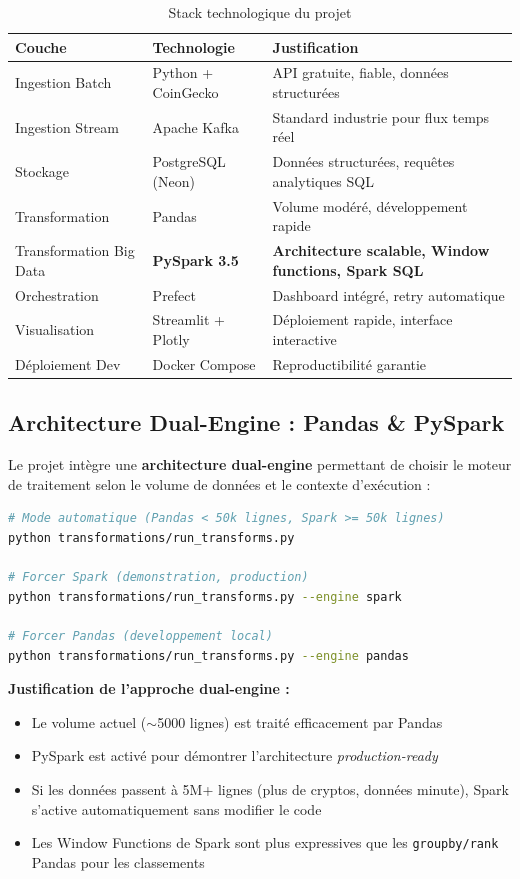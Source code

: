 \documentclass[12pt,a4paper]{article}
\begin{document}
\begin{table}[H]
\centering
\begin{tabular}{|l|l|p{5.5cm}|}
\hline
\textbf{Couche} & \textbf{Technologie} & \textbf{Justification} \\
\hline
Ingestion Batch    & Python + CoinGecko   & API gratuite, fiable, données structurées \\
\hline
Ingestion Stream   & Apache Kafka         & Standard industrie pour flux temps réel \\
\hline
Stockage           & PostgreSQL (Neon)    & Données structurées, requêtes analytiques SQL \\
\hline
Transformation     & Pandas               & Volume modéré, développement rapide \\
\hline
\rowcolor{orange!15}
Transformation Big Data & \textbf{PySpark 3.5} & \textbf{Architecture scalable, Window functions, Spark SQL} \\
\hline
Orchestration      & Prefect              & Dashboard intégré, retry automatique \\
\hline
Visualisation      & Streamlit + Plotly   & Déploiement rapide, interface interactive \\
\hline
Déploiement Dev    & Docker Compose       & Reproductibilité garantie \\
\hline
\end{tabular}
\caption{Stack technologique du projet}
\end{table}

\subsection{Architecture Dual-Engine : Pandas \& PySpark}

Le projet intègre une \textbf{architecture dual-engine} permettant de choisir le moteur de traitement selon le volume de données et le contexte d'exécution :

\begin{lstlisting}[language=bash]
# Mode automatique (Pandas < 50k lignes, Spark >= 50k lignes)
python transformations/run_transforms.py

# Forcer Spark (demonstration, production)
python transformations/run_transforms.py --engine spark

# Forcer Pandas (developpement local)
python transformations/run_transforms.py --engine pandas
\end{lstlisting}

\textbf{Justification de l'approche dual-engine :}
\begin{itemize}
    \item Le volume actuel ($\sim$5000 lignes) est traité efficacement par Pandas
    \item PySpark est activé pour démontrer l'architecture \textit{production-ready}
    \item Si les données passent à 5M+ lignes (plus de cryptos, données minute), Spark s'active automatiquement sans modifier le code
    \item Les Window Functions de Spark sont plus expressives que les \texttt{groupby/rank} Pandas pour les classements
\end{itemize}
\end{document}
